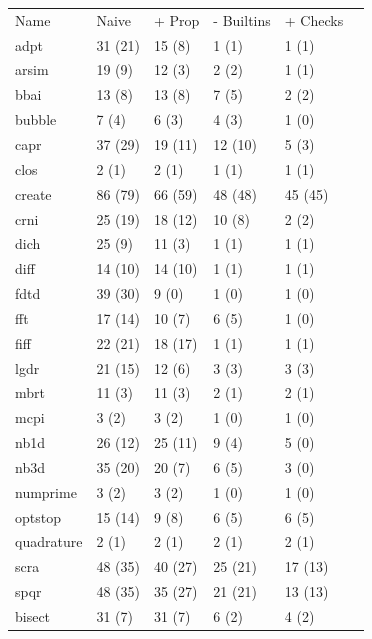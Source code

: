 \begin{table}
\centering
  \begin{tabular}{| l | l | l | l | l | l |}
  \hline
  Name & Naive & + Prop & - Builtins & + Checks \\ \hhline{|=|=|=|=|=|}
  adpt        & 31 (21) & 15 (8) & 1 (1) & 1 (1) \\ \hline
  arsim       & 19 (9) & 12 (3) & 2 (2) & 1 (1) \\ \hline
  bbai        & 13 (8) & 13 (8) & 7 (5) & 2 (2) \\ \hline
  bubble      & 7 (4) & 6 (3) & 4 (3) & 1 (0) \\ \hline
  capr        & 37 (29) & 19 (11) & 12 (10) & 5 (3) \\ \hline
  clos        & 2 (1) & 2 (1) & 1 (1) & 1 (1) \\ \hline
  create      & 86 (79) & 66 (59) & 48 (48) & 45 (45) \\ \hline
  crni        & 25 (19) & 18 (12) & 10 (8) & 2 (2) \\ \hline
  dich        & 25 (9) & 11 (3) & 1 (1) & 1 (1)  \\ \hline
  diff        & 14 (10) & 14 (10) & 1 (1) & 1 (1) \\ \hline
  fdtd        & 39 (30) & 9 (0) & 1 (0) & 1 (0) \\ \hline
  fft         & 17 (14) & 10 (7) & 6 (5) & 1 (0) \\ \hline
  fiff        & 22 (21) & 18 (17) & 1 (1) & 1 (1) \\ \hline
  lgdr        & 21 (15) & 12 (6) & 3 (3) & 3 (3) \\ \hline
  mbrt        & 11 (3) & 11 (3) & 2 (1) & 2 (1) \\ \hline
  mcpi        & 3 (2) & 3 (2) & 1 (0) & 1 (0) \\ \hline
  nb1d        & 26 (12) & 25 (11) & 9 (4) & 5 (0) \\ \hline
  nb3d        & 35 (20) & 20 (7) & 6 (5) & 3 (0) \\ \hline
  numprime    & 3 (2) & 3 (2) & 1 (0) & 1 (0) \\ \hline
  optstop     & 15 (14) & 9 (8) & 6 (5) & 6 (5) \\ \hline
  quadrature  & 2 (1) & 2 (1) & 2 (1) & 2 (1)\\ \hline
  scra        & 48 (35) & 40 (27) & 25 (21) & 17 (13) \\ \hline
  spqr        & 48 (35) & 35 (27) & 21 (21) & 13 (13) \\ \hhline{|=|=|=|=|=|}
  bisect      & 31 (7) & 31 (7) & 6 (2) & 4 (2) \\ \hline

\end{tabular}
\end{table}
